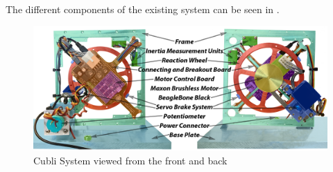 The different components of the existing system can be seen in .
%
%
\begin{figure}[H]
	\centering
	\includegraphics[scale=0.24]{figures/Cubli11}
	\caption{Cubli System viewed from the front and back}
	\label{Cubli-11}
\end{figure}
%
